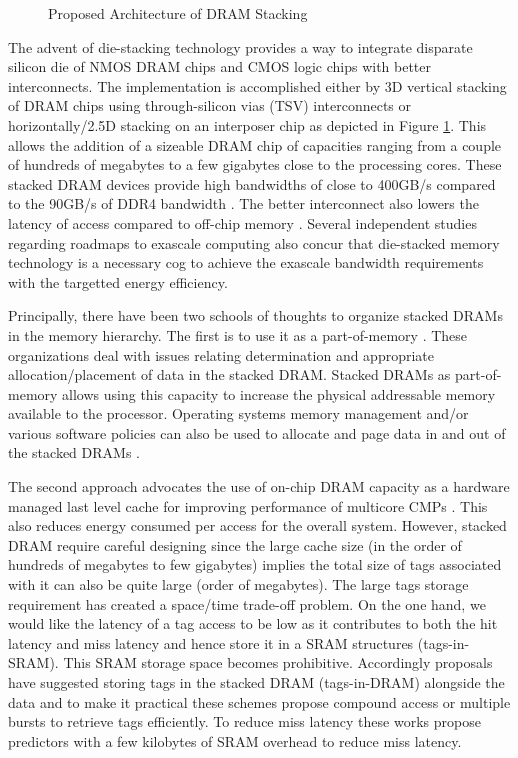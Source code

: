 \begin{figure}[!htb]
	\centering
	\def\svgwidth{\columnwidth}
	
	\caption{Proposed Architecture of DRAM Stacking}
	\label{fig:stackdram}
\end{figure}
\par The advent of die-stacking technology \cite{3d-stacking} provides a way to integrate disparate silicon die of NMOS DRAM chips and CMOS logic chips with better interconnects. The implementation is accomplished either by 3D vertical stacking of DRAM chips using through-silicon vias (TSV) interconnects or horizontally/2.5D stacking on an interposer chip as depicted in Figure \ref{fig:stackdram}. This allows the addition of a sizeable DRAM chip of capacities ranging from a couple of hundreds of megabytes to a few gigabytes close to the processing cores. These stacked DRAM devices provide high bandwidths of close to 400GB/s compared to the 90GB/s of DDR4 bandwidth \cite{xeonphi}. The better interconnect also lowers the latency of access compared to off-chip memory \cite{alloy}. Several independent studies regarding roadmaps to exascale computing \cite{apu-exascale,amd-exascale1} also concur that die-stacked memory technology is a necessary cog to achieve the exascale bandwidth requirements with the targetted energy efficiency. 
\par Principally, there have been two schools of thoughts to organize stacked DRAMs in the memory hierarchy. The first is to use it as a part-of-memory \cite{pom,cameo}. These organizations deal with issues relating determination and appropriate allocation/placement of data in the stacked DRAM. Stacked DRAMs as part-of-memory allows using this capacity to increase the physical addressable memory available to the processor. Operating systems memory management and/or various software policies can also be used to allocate and page data in and out of the stacked DRAMs \cite{software-dram}.
\par The second approach advocates the use of on-chip DRAM capacity as a hardware managed last level cache for improving performance of multicore CMPs \cite{alloy,bimodal,loh-hill,atcache,footprint}. This also reduces energy consumed per access for the overall system.
However, stacked DRAM require careful designing since the large cache size (in the order of hundreds of megabytes to few gigabytes) implies the total size of tags associated with it can also be quite large (order of megabytes). The large tags storage requirement has created a space/time trade-off problem. On the one hand, we would like the latency of a tag access to be low as it contributes to both the hit latency and miss latency and hence store it in a SRAM structures (tags-in-SRAM). This SRAM storage space becomes prohibitive. Accordingly proposals have suggested storing tags in the stacked DRAM (tags-in-DRAM) alongside the data and to make it practical these schemes propose compound access \cite{loh-hill} or multiple bursts \cite{alloy} to retrieve tags efficiently. To reduce miss latency these works propose predictors with a few kilobytes of SRAM overhead to reduce miss latency.



